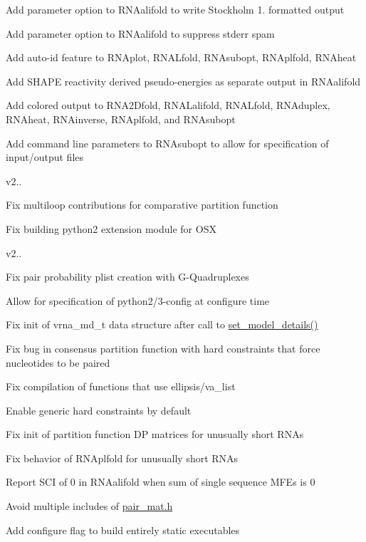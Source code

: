 \begin{DoxyItemize}
\item Add parameter option to R\+N\+Aalifold to write Stockholm 1. formatted output
\item Add parameter option to R\+N\+Aalifold to suppress stderr spam
\item Add auto-\/id feature to R\+N\+Aplot, R\+N\+A\+Lfold, R\+N\+Asubopt, R\+N\+Aplfold, R\+N\+Aheat
\item Add S\+H\+A\+PE reactivity derived pseudo-\/energies as separate output in R\+N\+Aalifold
\item Add colored output to R\+N\+A2\+Dfold, R\+N\+A\+Lalifold, R\+N\+A\+Lfold, R\+N\+Aduplex, R\+N\+Aheat, R\+N\+Ainverse, R\+N\+Aplfold, and R\+N\+Asubopt
\item Add command line parameters to R\+N\+Asubopt to allow for specification of input/output files
\end{DoxyItemize}

v2..
\begin{DoxyItemize}
\item Fix multiloop contributions for comparative partition function
\item Fix building python2 extension module for O\+SX
\end{DoxyItemize}

v2..
\begin{DoxyItemize}
\item Fix pair probability plist creation with G-\/\+Quadruplexes
\item Allow for specification of python2/3-\/config at configure time
\item Fix init of vrna\+\_\+md\+\_\+t data structure after call to \mbox{\hyperlink{group__model__details_gabad896c3650d420f3f3ddefc69e2bceb}{set\+\_\+model\+\_\+details()}}
\item Fix bug in consensus partition function with hard constraints that force nucleotides to be paired
\item Fix compilation of functions that use ellipsis/va\+\_\+list
\item Enable generic hard constraints by default
\item Fix init of partition function DP matrices for unusually short R\+N\+As
\item Fix behavior of R\+N\+Aplfold for unusually short R\+N\+As
\item Report S\+CI of 0 in R\+N\+Aalifold when sum of single sequence M\+F\+Es is 0
\item Avoid multiple includes of \mbox{\hyperlink{pair__mat_8h}{pair\+\_\+mat.\+h}}
\item Add configure flag to build entirely static executables
\end{DoxyItemize}

